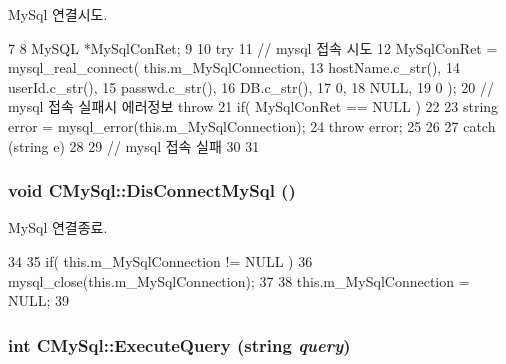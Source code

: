 MySql 연결시도. 


\begin{DoxyCode}
7 {
8         MySQL *MySqlConRet;
9 
10         try {
11                 // mysql 접속 시도
12                 MySqlConRet = mysql_real_connect( this.m_MySqlConnection,
13                                                                                  
       hostName.c_str(),
14                                                                                  
       userId.c_str(),
15                                                                                  
       passwd.c_str(),
16                                                                                  
       DB.c_str(),
17                                                                                  
       0,
18                                                                                  
       NULL,
19                                                                                  
       0 );
20                 // mysql 접속 실패시 에러정보 throw
21                 if( MySqlConRet == NULL )
22                 {
23                         string error = mysql_error(this.m_MySqlConnection);
24                         throw error;
25                 }
26         }
27         catch (string e)
28         {
29                 // mysql 접속 실패
30         }
31 }
\end{DoxyCode}
\hypertarget{classCMySql_a20481aded19016f0d1b0eaf8d27aa558}{
\subsubsection[{DisConnectMySql}]{\setlength{\rightskip}{0pt plus 5cm}void CMySql::DisConnectMySql ()}}
\label{classCMySql_a20481aded19016f0d1b0eaf8d27aa558}


MySql 연결종료. 


\begin{DoxyCode}
34 {
35         if( this.m_MySqlConnection != NULL )
36                 mysql_close(this.m_MySqlConnection);
37 
38         this.m_MySqlConnection = NULL;
39 }
\end{DoxyCode}
\hypertarget{classCMySql_a829b67873c1ccc01565d19c7dbac717b}{
\subsubsection[{ExecuteQuery}]{\setlength{\rightskip}{0pt plus 5cm}int CMySql::ExecuteQuery (string {\em query})}}
\label{classCMySql_a829b67873c1ccc01565d19c7dbac717b}


